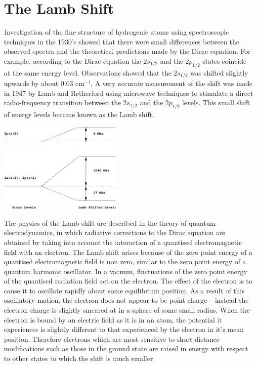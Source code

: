 \documentclass[a4paper]{serif}
\begin{document}
\section{The Lamb Shift}
    Investigation of the fine structure of hydrogenic atoms using spectroscopic techniques
    in the 1930's showed that there were small differences between the observed spectra
    and the theoretical predictions made by the Dirac equation.
    For example, according to the Dirac equation the $2s_{1/2}$ and the $2p_{1/2}$ states
    coincide at the same energy level. Observations showed that the $2s_{1/2}$ was shifted 
    slightly upwards by about 0.03 cm$^{-1}$.
    A very accurate measurement of the shift was made in 1947 by Lamb and Retherford using
    microwave techniques to stimulate a direct radio-frequency transition between the 
    $2s_{1/2}$ and the $2p_{1/2}$ levels. This small shift of energy levels became known
    as the Lamb shift.
    \begin{center}
        \includegraphics[width=6cm]{lamb.eps}
    \end{center}
    The physics of the Lamb shift are described in the theory of quantum electrodynamics,
    in which radiative corrections to the Dirac equation are obtained by taking into
    account the interaction of a quantised electromagnetic field with an electron.
    The Lamb shift arises because of the zero point energy of a quantised electromagnetic
    field is non zero, similar to the zero point energy of a quantum harmonic oscillator.
    In a vacuum, fluctuations of the zero point energy of the quantised radiation field
    act on the electron. The effect of the electron is to cause it to oscillate rapidly
    about some equilibrium position. As a result of this oscillatory motion, the electron
    does not appear to be point charge -- instead the electron charge is slightly smeared
    at in a sphere of some small radius. When the electron is bound by an electric field
    as it is in an atom, the potential it experiences is slightly different to that 
    experienced by the electron in it's mean position. Therefore electrons which are
    most sensitive to short distance modifications such as those in the ground state
    are raised in energy with respect to other states to which the shift is much smaller.
\end{document}
